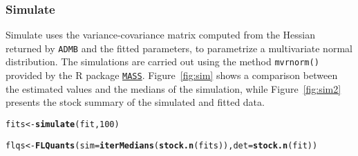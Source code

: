 \documentclass[a4paper,english,10pt]{article}\usepackage[]{graphicx}\usepackage[]{color}
\makeatletter
\newcommand{\hlnum}[1]{\textcolor[rgb]{0.686,0.059,0.569}{#1}}%
\newcommand{\hlstd}[1]{\textcolor[rgb]{0.345,0.345,0.345}{#1}}%
\newcommand{\hlkwb}[1]{\textcolor[rgb]{0.69,0.353,0.396}{#1}}%
\newcommand{\hlkwc}[1]{\textcolor[rgb]{0.333,0.667,0.333}{#1}}%
\newcommand{\hlkwd}[1]{\textcolor[rgb]{0.737,0.353,0.396}{\textbf{#1}}}%
\newenvironment{kframe}{%
 \def\at@end@of@kframe{}%
 \ifinner\ifhmode%
  \def\at@end@of@kframe{\end{minipage}}%
  \begin{minipage}{\columnwidth}%
 \fi\fi%
 \def\FrameCommand##1{\hskip\@totalleftmargin \hskip-\fboxsep
 \colorbox{shadecolor}{##1}\hskip-\fboxsep
     \hskip-\linewidth \hskip-\@totalleftmargin \hskip\columnwidth}%
 \MakeFramed {\advance\hsize-\width
   \@totalleftmargin\z@ \linewidth\hsize
   \@setminipage}}%
 {\par\unskip\endMakeFramed%
 \at@end@of@kframe}
\newenvironment{knitrout}{}{} %
\newcommand{\code}[1]{{\texttt{#1}}}
\newcommand{\pkg}[1]{{\texttt{#1}}}
\makeatother
\begin{document}
\subsubsection{Simulate}

Simulate uses the variance-covariance matrix computed from the Hessian returned by \pkg{ADMB} and the fitted parameters, to parametrize a multivariate normal distribution. The simulations are carried out using the method \code{mvrnorm()} provided by the R package \href{http://cran.r-project.org/web/packages/MASS/}{\pkg{MASS}}. Figure~\ref{fig:sim} shows a comparison between the estimated values and the medians of the simulation, while Figure~\ref{fig:sim2} presents the stock summary of the simulated and fitted data.

\begin{knitrout}
\color{fgcolor}\begin{kframe}
\begin{alltt}
\hlstd{fits} \hlkwb{<-} \hlkwd{simulate}\hlstd{(fit,} \hlnum{100}\hlstd{)}
\end{alltt}


{\ttfamily\noindent\bfseries\color{errorcolor}{\#\# Error: object 'fit' not found}}\begin{alltt}
\hlstd{flqs} \hlkwb{<-} \hlkwd{FLQuants}\hlstd{(}\hlkwc{sim}\hlstd{=}\hlkwd{iterMedians}\hlstd{(}\hlkwd{stock.n}\hlstd{(fits)),} \hlkwc{det}\hlstd{=}\hlkwd{stock.n}\hlstd{(fit))}
\end{alltt}


{\ttfamily\noindent\bfseries{}}\end{kframe}
\end{knitrout}

\begin{knitrout}
\color{fgcolor}\begin{kframe}


{\ttfamily\noindent\bfseries{}}\end{kframe}
\end{knitrout}

\begin{knitrout}
\color{fgcolor}\begin{kframe}


{\ttfamily\noindent\bfseries\color{errorcolor}{\#\# Error: object 'ple4' not found}}

{\ttfamily\noindent\bfseries\color{errorcolor}{\#\# Error: object 'stks' not found}}\end{kframe}
\end{knitrout}
\end{document}
